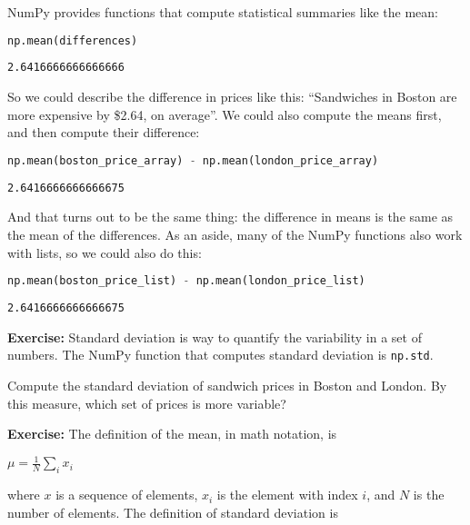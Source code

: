 NumPy provides functions that compute statistical summaries like the
mean:

\begin{lstlisting}[language=Python,style=source]
np.mean(differences)
\end{lstlisting}

\begin{lstlisting}[style=output]
2.6416666666666666
\end{lstlisting}

So we could describe the difference in prices like this: ``Sandwiches in
Boston are more expensive by \$2.64, on average''. We could also compute
the means first, and then compute their difference:

\begin{lstlisting}[language=Python,style=source]
np.mean(boston_price_array) - np.mean(london_price_array)
\end{lstlisting}

\begin{lstlisting}[style=output]
2.6416666666666675
\end{lstlisting}

And that turns out to be the same thing: the difference in means is the
same as the mean of the differences. As an aside, many of the NumPy
functions also work with lists, so we could also do this:

\begin{lstlisting}[language=Python,style=source]
np.mean(boston_price_list) - np.mean(london_price_list)
\end{lstlisting}

\begin{lstlisting}[style=output]
2.6416666666666675
\end{lstlisting}

\textbf{Exercise:} Standard deviation is way to quantify the variability
in a set of numbers. The NumPy function that computes standard deviation
is \passthrough{\lstinline!np.std!}.

Compute the standard deviation of sandwich prices in Boston and London.
By this measure, which set of prices is more variable?

\textbf{Exercise:} The definition of the mean, in math notation, is

\(\mu = \frac{1}{N} \sum_i x_i\)

where \(x\) is a sequence of elements, \(x_i\) is the element with index
\(i\), and \(N\) is the number of elements. The definition of standard
deviation is


